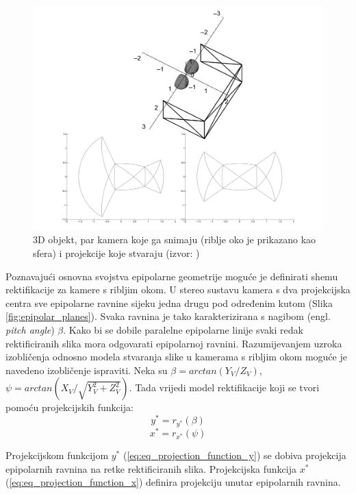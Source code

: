 \documentclass[../seminar.tex]{subfiles}
\begin{document}
\begin{figure}[ht!]
  \centering
    \includegraphics[width=.99\textwidth]{img_009_object_projection_medium.png}
   \caption{3D objekt, par kamera koje ga snimaju (riblje oko je prikazano kao sfera) i projekcije koje stvaraju (izvor: \cite{Abraham})}
  \label{fig:rectification_object_projection}
\end{figure}


Poznavajući osnovna svojstva epipolarne geometrije moguće je definirati shemu rektifikacije za kamere s ribljim okom. 
U stereo sustavu kamera s dva projekcijska centra sve epipolarne ravnine sijeku jedna drugu pod određenim kutom (Slika \ref{fig:epipolar_planes}). 
Svaka ravnina je tako karakterizirana s nagibom (engl. \textit{pitch angle}) $\beta$. 
Kako bi se dobile paralelne epipolarne linije svaki redak rektificiranih slika mora odgovarati epipolarnoj ravnini. 
Razumijevanjem uzroka izobličenja odnosno modela stvaranja slike u kamerama s ribljim okom moguće je navedeno izobličenje ispraviti. 
Neka su $\beta = arctan(Y_V/Z_V)$, $\psi = arctan(X_V/\sqrt{Y^2_V+Z^2_V})$. Tada vrijedi model rektifikacije koji se tvori pomoću projekcijskih funkcija:
\begin{equation}
\label{eq:eq_projection_function_y}
y^* = r_{y^*}(\beta)
\end{equation}
\begin{equation}
\label{eq:eq_projection_function_x}
x^* = r_{x^*}(\psi)
\end{equation}

Projekcijskom funkcijom $y^*$ (\ref{eq:eq_projection_function_y}) se dobiva projekcija epipolarnih ravnina na retke rektificiranih slika. Projekcijska funkcija $x^*$ (\ref{eq:eq_projection_function_x}) definira projekciju unutar epipolarnih ravnina. 
\end{document}
